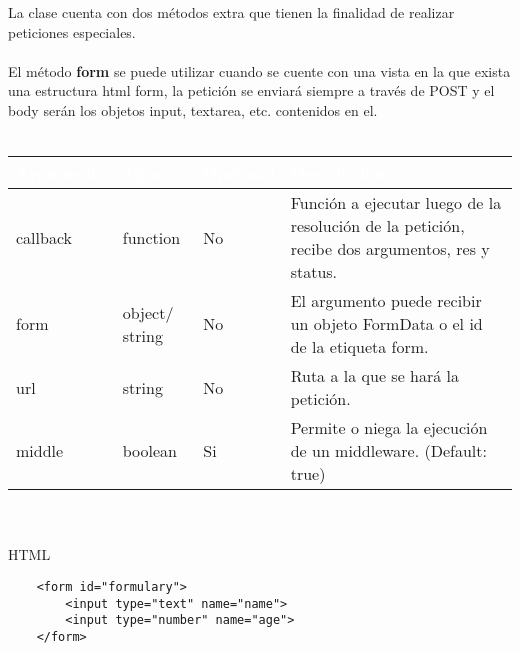 \documentclass[10pt]{article}
\begin{document}
La clase cuenta con dos métodos extra que tienen la finalidad de realizar peticiones especiales.
\\\\
El método \textbf{form} se puede utilizar cuando se cuente con una vista en la que exista una estructura html form, la petición se enviará siempre a través de POST y el body serán los objetos input, textarea, etc. contenidos en el.
\\\\
\begin{tabular}{|m{1.8cm}|m{2cm}|m{1.5cm}|m{9cm}|}
	\hline
	\rowcolor{black}\textcolor{white}{Argumento} & \textcolor{white}{Tipo} & \textcolor{white}{Opcional} & \textcolor{white}{Descripción} \\
	\hline
	callback & function & No & Función a ejecutar luego de la resolución de la petición, recibe dos argumentos, res y status. \\
	\hline
	form & object$/$string & No & El argumento puede recibir un objeto FormData o el id de la etiqueta form. \\
	\hline
	url & string & No & Ruta a la que se hará la petición. \\
	\hline
	middle & boolean & Si & Permite o niega la ejecución de un middleware. (Default: true) \\
	\hline
\end{tabular}
\\\\
\noindent
\footnotesize{HTML} \normalsize{}
\lstset{language=HTML}
\begin{lstlisting}
	<form id="formulary">
		<input type="text" name="name">
		<input type="number" name="age">
	</form>
\end{lstlisting}
\end{document}
